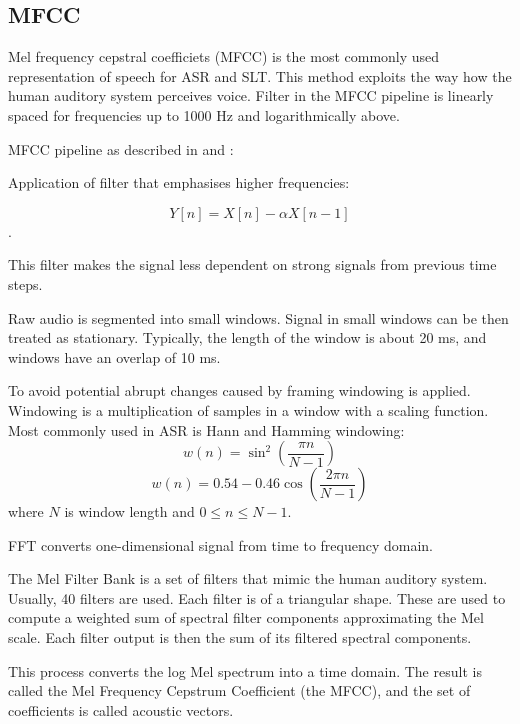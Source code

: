 \subsection{MFCC}
\label{mfcc}
Mel frequency cepstral coefficiets (MFCC) is the most commonly used representation of speech for ASR and SLT. 
This method exploits the way how the human auditory system perceives voice. Filter in the MFCC pipeline is linearly spaced for frequencies up to 1000 Hz and logarithmically above. 

MFCC pipeline as described in  and :

\begin{enumerate}
	 Application of filter that emphasises higher frequencies:
	
	\begin{equation}
	Y[n] = X[n] - \alpha X[n-1]
	\end{equation}.
	
	This filter makes the signal less dependent on strong signals from previous time steps.
	
	 Raw audio is segmented into small windows. Signal in small windows can be then treated as stationary. Typically, the length of the window is about 20 ms, and windows have an overlap of 10 ms.
	
	 To avoid potential abrupt changes caused by framing windowing is applied. Windowing is a multiplication of samples in a window with a scaling function. Most commonly used in ASR is Hann and Hamming windowing:
	\begin{equation}
	w(n) = \sin^2{\left( \frac{\pi n}{N - 1} \right)}
	\end{equation}
	\begin{equation}
	w(n) = 0.54 - 0.46 \cos{\left(\frac{2\pi n}{N - 1}\right)}
	\end{equation}
	where $N$ is window length and $0 \leq n \leq N - 1$.
	
	 FFT converts one-dimensional signal from time to frequency domain.
	
	The Mel Filter Bank is a set of filters that mimic the human auditory system. Usually, 40 filters are used. Each filter is of a triangular shape. These are used to compute a weighted sum of spectral filter components approximating the Mel scale.
	Each filter output is then the sum of its filtered spectral components. 
	
	 This process converts the log Mel spectrum into a time domain. The result is called the Mel Frequency Cepstrum Coefficient (the MFCC), and the set of coefficients is called acoustic vectors.
\end{enumerate}


